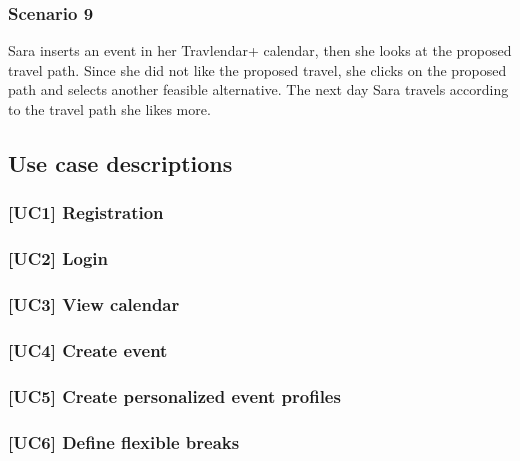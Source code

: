 	\subsubsection{Scenario 9}
		Sara inserts an event in her Travlendar+ calendar, then she looks at the proposed travel path. Since she did not like the proposed travel, she clicks on the proposed path and selects another feasible alternative. The next day Sara travels according to the travel path she likes more.	
	
\subsection{Use case descriptions}
\label{subsect:Use case descriptions}

	\subsubsection{[UC1] Registration}
		
		
	\subsubsection{[UC2] Login}
		
		
	\subsubsection{[UC3] View calendar}
		
		
	\subsubsection{[UC4] Create event}
		
		
	\subsubsection{[UC5] Create personalized event profiles}
		
		
	\subsubsection{[UC6] Define flexible breaks}
			
		
